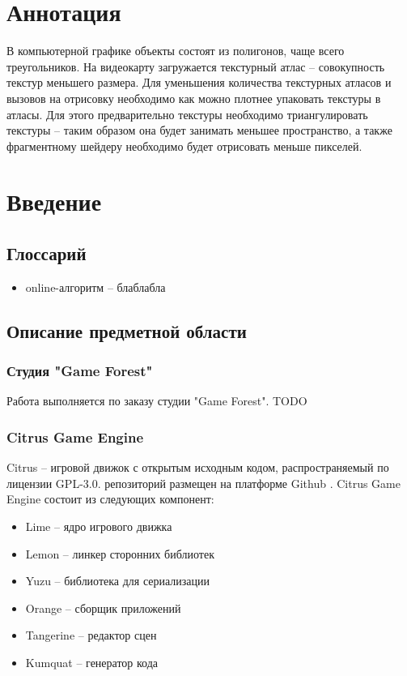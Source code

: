 \documentclass{fefu}
\author{Терехов Д.Е.}
\begin{document}
\makereporttitle
\tableofcontents
\pagebreak
\section*{Аннотация}
В компьютерной графике объекты состоят из полигонов, чаще всего треугольников.
На видеокарту загружается текстурный атлас -- совокупность текстур меньшего размера.
Для уменьшения количества текстурных атласов и вызовов на отрисовку необходимо как можно плотнее упаковать
текстуры в атласы. Для этого предварительно текстуры необходимо триангулировать текстуры -- таким образом
 она будет занимать меньшее пространство, а также фрагментному шейдеру необходимо будет отрисовать меньше пикселей.
\section{Введение}
\subsection{Глоссарий}
\begin{itemize}
    \item online-алгоритм -- блаблабла
\end{itemize}
\subsection{Описание предметной области}
\subsubsection{Студия "Game Forest"}
Работа выполняется по заказу студии "Game Forest". TODO
\subsubsection{Citrus Game Engine}
Citrus -- игровой движок с открытым исходным кодом, распространяемый по лицензии GPL-3.0.
репозиторий размещен на платформе Github \cite{CitrusRepo}. Citrus Game Engine
состоит из следующих компонент:
\begin{itemize}
    \item Lime -- ядро игрового движка
    \item Lemon -- линкер сторонних библиотек
    \item Yuzu -- библиотека для сериализации
    \item Orange -- сборщик приложений
    \item Tangerine -- редактор сцен
    \item Kumquat -- генератор кода
\end{itemize}
\end{document}
